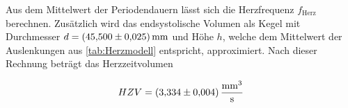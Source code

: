 \noindent Aus dem Mittelwert der Periodendauern lässt sich die Herzfrequenz $f_\text{Herz}$ berechnen. Zusätzlich wird das 
endsystolische Volumen als Kegel mit Durchmesser $d = \qty{45.5\pm0.025}{\milli\meter}$ und Höhe $h$, welche dem Mittelwert
der Auslenkungen aus \ref{tab:Herzmodell} entspricht, approximiert. Nach dieser Rechnung beträgt das Herzzeitvolumen 

\begin{equation*}
    HZV = \qty{3.334\pm0.004}{\cubic\milli\meter\per\second}
\end{equation*}

